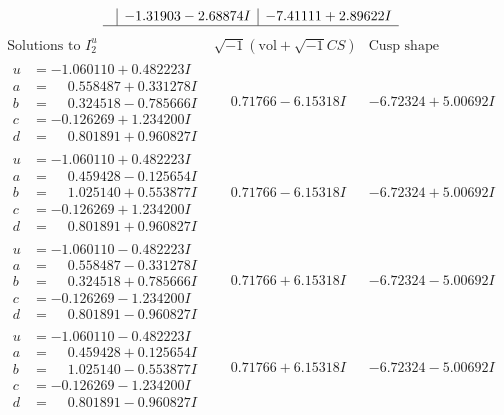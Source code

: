 \documentclass[1p]{elsarticle_modified}
\theoremstyle{definition}
\newcommand{\I}{\sqrt{-1}}
\begin{document}
$$\begin{array}{c|c|c}
 & -1.31903 - 2.68874 I & -7.41111 + 2.89622 I\\
 \hline 
 \end{array}$$\newpage$$\begin{array}{c|c|c}  
\text{Solutions to }I^u_{2}& \I (\text{vol} + \sqrt{-1}CS) & \text{Cusp shape}\\
 \hline 
\begin{aligned}
u &= -1.060110 + 0.482223 I \\
a &= \phantom{-}0.558487 + 0.331278 I \\
b &= \phantom{-}0.324518 - 0.785666 I \\
c &= -0.126269 + 1.234200 I \\
d &= \phantom{-}0.801891 + 0.960827 I\end{aligned}
 & \phantom{-}0.71766 - 6.15318 I & -6.72324 + 5.00692 I \\ \hline\begin{aligned}
u &= -1.060110 + 0.482223 I \\
a &= \phantom{-}0.459428 - 0.125654 I \\
b &= \phantom{-}1.025140 + 0.553877 I \\
c &= -0.126269 + 1.234200 I \\
d &= \phantom{-}0.801891 + 0.960827 I\end{aligned}
 & \phantom{-}0.71766 - 6.15318 I & -6.72324 + 5.00692 I \\ \hline\begin{aligned}
u &= -1.060110 - 0.482223 I \\
a &= \phantom{-}0.558487 - 0.331278 I \\
b &= \phantom{-}0.324518 + 0.785666 I \\
c &= -0.126269 - 1.234200 I \\
d &= \phantom{-}0.801891 - 0.960827 I\end{aligned}
 & \phantom{-}0.71766 + 6.15318 I & -6.72324 - 5.00692 I \\ \hline\begin{aligned}
u &= -1.060110 - 0.482223 I \\
a &= \phantom{-}0.459428 + 0.125654 I \\
b &= \phantom{-}1.025140 - 0.553877 I \\
c &= -0.126269 - 1.234200 I \\
d &= \phantom{-}0.801891 - 0.960827 I\end{aligned}
 & \phantom{-}0.71766 + 6.15318 I & -6.72324 - 5.00692 I \\ \hline\begin{aligned}

\end{aligned}
\end{array}$$
\end{document}
